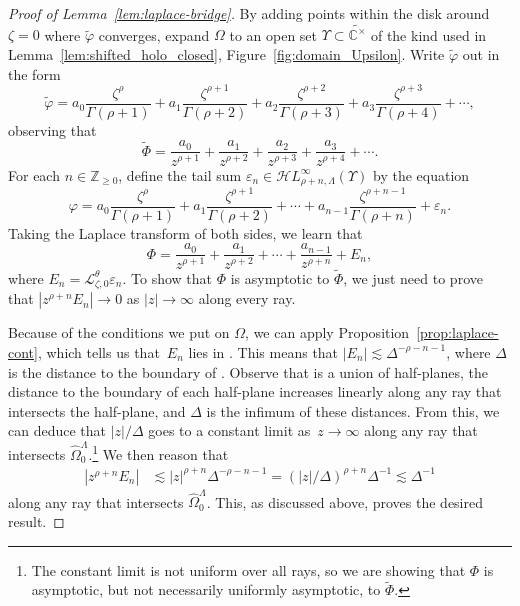 \documentclass[pdftex]{sigma}
\newcommand{\singexp}[2]{\mathcal{H}L^\infty_{#1, #2}}
\newcommand{\dualsingexp}[1]{\widehat{\mathcal{H}}L^\infty_{#1}}
\newcommand{\Z}{\mathbb{Z}}
\newcommand{\C}{\mathbb{C}}
\newcommand{\series}[1]{\tilde{#1}}
\newcommand{\laplace}{\mathcal{L}}
\numberwithin{equation}{section}
\begin{document}
\begin{proof}[Proof of Lemma~\ref{lem:laplace-bridge}]
By adding points within the disk around $\zeta = 0$ where $\series{\varphi}$ converges, expand $\Omega$ to an open set $\Upsilon \subset \widetilde{\C^\times}$ of the kind used in Lemma~\ref{lem:shifted_holo_closed}, Figure~\ref{fig:domain_Upsilon}. Write $\series{\varphi}$ out in the form
\[ \series{\varphi} = a_0 \frac{\zeta^\rho}{\Gamma(\rho+1)} + a_1 \frac{\zeta^{\rho+1}}{\Gamma(\rho+2)} + a_2 \frac{\zeta^{\rho+2}}{\Gamma(\rho+3)} + a_3 \frac{\zeta^{\rho+3}}{\Gamma(\rho+4)} + \cdots, \]
observing that
\[ \series{\Phi} = \frac{a_0}{z^{\rho+1}} + \frac{a_1}{z^{\rho+2}} + \frac{a_2}{z^{\rho+3}} + \frac{a_3}{z^{\rho+4}} + \cdots. \]
For each $n \in \Z_{\ge 0}$, define the tail sum $\varepsilon_n \in \singexp{\rho+n}{\Lambda}(\Upsilon)$ by the equation
\[ \varphi = a_0 \frac{\zeta^\rho}{\Gamma(\rho+1)} + a_1 \frac{\zeta^{\rho+1}}{\Gamma(\rho+2)} + \cdots + a_{n-1} \frac{\zeta^{\rho+n-1}}{\Gamma(\rho+n)} + \varepsilon_n. \]
Taking the Laplace transform of both sides, we learn that
\[ \Phi = \frac{a_0}{z^{\rho+1}} + \frac{a_1}{z^{\rho+2}} + \cdots + \frac{a_{n-1}}{z^{\rho+n}} + E_n, \]
where $E_n = \laplace_{\zeta, 0}^\theta \varepsilon_n$. To show that $\Phi$ is asymptotic to $\series{\Phi}$, we just need to prove that $|z^{\rho+n} E_n| \to 0$ as $|z| \to \infty$ along every ray.

Because of the conditions we put on $\Omega$, we can apply Proposition~\ref{prop:laplace-cont}, which tells us that~$E_n$ lies in \smash{$\dualsingexp{-\rho-n-1}\bigl(\widehat{\Omega}_0^\Lambda\bigr)$}. This means that $|E_n| \lesssim \Delta^{-\rho-n-1}$, where $\Delta$ is the distance to the boundary of . Observe that  is a union of half-planes, the distance to the boundary of each half-plane increases linearly along any ray that intersects the half-plane, and $\Delta$ is the infimum of these distances. From this, we can deduce that $|z|/\Delta$ goes to a constant limit as~${z \to \infty}$ along any ray that intersects $\widehat{\Omega}_0^\Lambda$.\footnote{The constant limit is not uniform over all rays, so we are showing that $\Phi$ is asymptotic, but not necessarily uniformly asymptotic, to $\series{\Phi}$.} We then reason that
\begin{align*}
|z^{\rho+n} E_n| & \lesssim |z|^{\rho+n} \Delta^{-\rho-n-1} = (|z|/\Delta)^{\rho+n} \Delta^{-1} \lesssim \Delta^{-1}
\end{align*}
along any ray that intersects $\widehat{\Omega}_0^\Lambda$. This, as discussed above, proves the desired result.
\end{proof}
\end{document}
